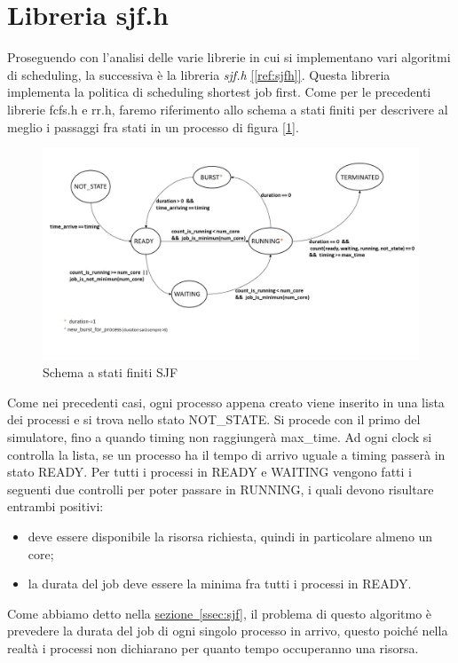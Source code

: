 \documentclass[Lau, oneside]{sapthesis}%
\begin{document}
\section{Libreria sjf.h}
\label{sec:sjf.h}
Proseguendo con l'analisi delle varie librerie in cui si implementano vari algoritmi di scheduling, la successiva è la libreria \textit{sjf.h} \hyperref[ref:sjfh]{[\ref*{ref:sjfh}]}.
Questa libreria implementa la politica di scheduling shortest job first.
Come per le precedenti librerie fcfs.h e rr.h, faremo riferimento allo schema a stati finiti per descrivere al meglio i passaggi fra stati in un processo di figura \hyperref[figura:sjf]{[\ref*{figura:sjf}]}.
\begin{figure}[ht!]
  \centering
  \includegraphics[width=1\textwidth]{schema a stati finiti SJF.jpg}
  \caption{Schema a stati finiti SJF}
  \label{figura:sjf}
\end{figure}
Come nei precedenti casi, ogni processo appena creato viene inserito in una lista dei processi e si trova nello stato NOT\_STATE.
Si procede con il primo del simulatore, fino a quando timing non raggiungerà max\_time.
Ad ogni clock si controlla la lista, se un processo ha il tempo di arrivo uguale a timing passerà in stato READY.
Per tutti i processi in READY e WAITING vengono fatti i seguenti due controlli per poter passare in RUNNING, i quali devono risultare entrambi positivi:
\begin{itemize}
    \item deve essere disponibile la risorsa richiesta, quindi in particolare almeno un core;
    \item la durata del job deve essere la minima fra tutti i processi in READY.
\end{itemize}
Come abbiamo detto nella \hyperref[ssec:sjf]{sezione~\ref*{ssec:sjf}}, il problema di questo algoritmo è prevedere la durata del job di ogni singolo processo in arrivo, questo poiché nella realtà i processi non dichiarano per quanto tempo occuperanno una risorsa.
\end{document}
